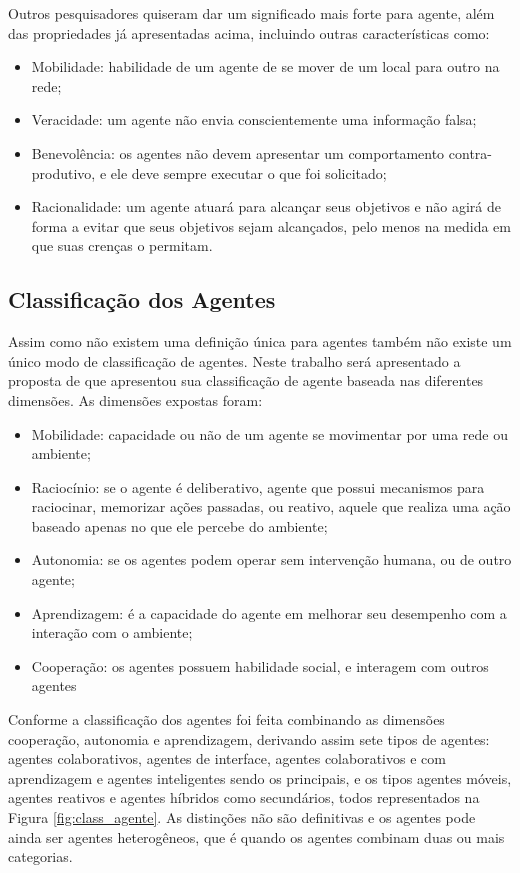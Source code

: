 Outros pesquisadores quiseram dar um significado mais forte para agente, além das propriedades já apresentadas acima, incluindo outras características como:

\begin{itemize}
\item Mobilidade: habilidade de um agente de se mover de um local para outro na rede;
\item Veracidade: um agente não envia conscientemente uma informação falsa;
\item Benevolência: os agentes não devem apresentar um comportamento contra-produtivo, e ele deve sempre executar o que foi solicitado;
\item Racionalidade: um agente atuará para alcançar seus objetivos e não agirá de forma a evitar que seus objetivos sejam alcançados, pelo menos na medida em que suas crenças o permitam.
\end{itemize}

\subsection{Classificação dos Agentes}

Assim como não existem uma definição única para agentes também não existe um único modo de classificação de agentes. Neste trabalho será apresentado a proposta de \citet{nwana1996software} que apresentou sua classificação de agente baseada nas diferentes dimensões. As dimensões expostas foram:

\begin{itemize}
\item Mobilidade: capacidade ou não de um agente se movimentar por uma rede ou ambiente;
\item Raciocínio: se o agente é deliberativo, agente que possui mecanismos para raciocinar, memorizar ações passadas, ou reativo, aquele que realiza uma ação baseado apenas no que ele percebe do ambiente;
\item Autonomia: se os agentes podem operar sem intervenção humana, ou de outro agente;
\item Aprendizagem: é a capacidade do agente em melhorar seu desempenho com a interação com o ambiente;
\item Cooperação: os agentes possuem habilidade social, e interagem com outros agentes
\end{itemize}

 Conforme \cite{nwana1996software} a classificação dos agentes foi feita  combinando as dimensões cooperação, autonomia e aprendizagem, derivando assim sete tipos de agentes: agentes colaborativos, agentes de interface, agentes colaborativos e com aprendizagem e agentes inteligentes sendo os principais, e os tipos  agentes móveis, agentes reativos e agentes híbridos como secundários, todos representados na Figura \ref{fig:class_agente}. As distinções não são definitivas e os agentes pode ainda ser agentes heterogêneos, que é quando os agentes combinam duas ou mais categorias.



